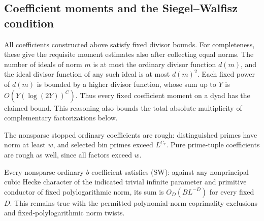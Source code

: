 \subsection{Coefficient moments and the Siegel--Walfisz condition}

All coefficients constructed above satisfy fixed divisor bounds.
For completeness, these give the requisite moment estimates also
after collecting equal norms.  The number of ideals of norm $m$ is
at most the ordinary divisor function $d(m)$, and the ideal divisor
function of any such ideal is at most $d(m)^2$.  Each fixed power
of $d(m)$ is bounded by a higher divisor function, whose sum up to
$Y$ is $O(Y(\log(2Y))^C)$.  Thus every fixed coefficient moment
on a dyad has the claimed bound.  This reasoning also bounds the
total absolute multiplicity of complementary factorizations below.

The nonsparse stopped ordinary coefficients are rough: distinguished
primes have norm at least $w$, and selected bin primes exceed
$L^{C_r}$.  Pure prime-tuple coefficients are rough as well, since
all factors exceed $w$.

\begin{lemma}\label{lem:decomposition-sw}
Every nonsparse ordinary $b$ coefficient satisfies \textup{(SW)}:
against any nonprincipal cubic Hecke character of the indicated
trivial infinite parameter and primitive conductor of fixed
polylogarithmic norm, its sum is $O_D(BL^{-D})$ for every fixed $D$.
This remains true with the permitted polynomial-norm coprimality
exclusions and fixed-polylogarithmic norm twists.
\end{lemma}

